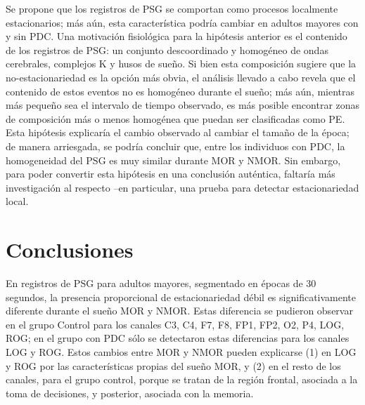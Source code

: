 \documentclass[12pt,a4paper]{mitthesis}
\begin{document}
Se propone que los registros de PSG se comportan como procesos localmente estacionarios; m\'as 
a\'un, esta caracter\'istica podr\'ia cambiar en adultos mayores con y sin PDC. 
Una motivaci\'on fisiol\'ogica para la hip\'otesis anterior es el contenido de los registros de
PSG: un conjunto descoordinado y homog\'eneo de ondas cerebrales, complejos K y husos de sue\~no.
Si bien esta composici\'on sugiere que la no-estacionariedad es la opci\'on m\'as obvia, el
an\'alisis llevado a cabo revela que el contenido de estos eventos no es homog\'eneo durante el
sue\~no; m\'as a\'un, mientras m\'as peque\~no sea el intervalo de tiempo observado, es m\'as
posible encontrar zonas de composici\'on m\'as o menos homog\'enea que puedan ser clasificadas
como PE.
Esta hip\'otesis explicar\'ia el cambio observado al cambiar el tama\~no de la \'epoca; de manera
arriesgada, se podr\'ia concluir que, entre los individuos con PDC, la homogeneidad del PSG es muy
similar durante MOR y NMOR.
Sin embargo, para poder convertir esta hip\'otesis en una conclusi\'on aut\'entica, faltar\'ia
m\'as investigaci\'on al respecto --en particular, una prueba para detectar estacionariedad local.


\section{Conclusiones}

En registros de PSG para adultos mayores, segmentado en \'epocas de 30 segundos, la presencia 
proporcional de estacionariedad d\'ebil es significativamente diferente durante el sue\~no MOR y NMOR.
Estas diferencia se pudieron observar en el grupo Control para los canales C3, C4, F7, F8, FP1, 
FP2, O2, P4, LOG, ROG; en el grupo con PDC s\'olo se detectaron estas diferencias para los canales 
LOG y ROG.
Estos cambios entre MOR y NMOR pueden explicarse (1) en LOG y ROG por las caracter\'isticas propias 
del sue\~no MOR, y (2) en el resto de los canales, para el grupo control, porque se tratan de la 
regi\'on frontal, asociada a la toma de decisiones, y posterior, asociada con la memoria.

\end{document}
